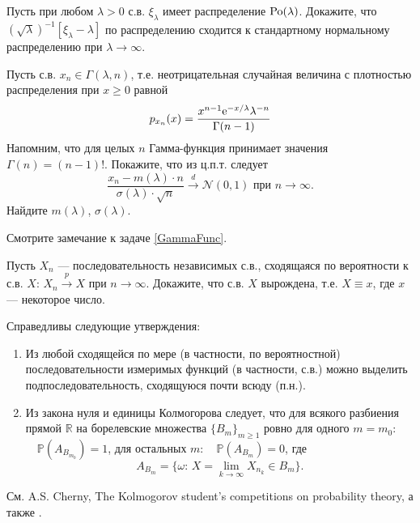 \begin{problem}
Пусть при любом $\lambda >0$ с.в. $\xi _{\lambda } $ имеет распределение $\mathrm{Po}(\lambda)$. Докажите, что $(\sqrt{\lambda})^{-1}[\xi _{\lambda } -\lambda]  $ по распределению сходится  к стандартному нормальному распределению при $\lambda \to \infty $.
\end{problem}

\begin{problem} 
Пусть с.в. $x_n\in \Gamma(\lambda,n)$, т.е. неотрицательная случайная величина  с плотностью распределения при $x\geq 0$ равной 
$$
p_{x_n}(x) = \dfrac{x^{n-1}{\rm e}^{-x/\lambda}\lambda^{-n}}{\Gamma(n-1)}
$$
Напомним, что для целых $n$ Гамма-функция принимает значения $\Gamma(n) = (n-1)!$.
Покажите, что из ц.п.т. следует 
$$
\frac{x_n-m(\lambda)\cdot n}{\sigma(\lambda)\cdot\sqrt{n}} \xrightarrow{d} \mathcal{N}(0,1) \text{ при } n\to\infty . 
$$
Найдите $m(\lambda)$, $\sigma(\lambda)$. 
\end{problem}
\begin{remark}
Смотрите замечание к задаче \ref{GammaFunc}.
\end{remark}

\begin{problem}
Пусть $X_n$ --- последовательность независимых с.в., сходящаяся по вероятности к с.в. $X$:  $X_n\xrightarrow{p}X$ при $n\to\infty$. Докажите, 
что с.в. $X$ вырождена, т.е. $X\equiv x$, где $x$ --- некоторое число. 
\end{problem}

\begin{remark}

Справедливы следующие утверждения:

\begin{enumerate}
\item
Из любой сходящейся по мере (в частности, по вероятностной) последовательности 
измеримых функций (в частности, с.в.) можно выделить подпоследовательность, сходящуюся почти всюду (п.н.). 

\item
Из закона нуля и единицы Колмогорова следует, что для всякого разбиения прямой ${\mathbb R}$ на борелевские множества $\{ B_m\}_{m\geqslant 1}$ 
ровно для одного $m=m_0:$ $\quad {\mathbb P}(A_{B_{m_0}})=1$, для остальных $m:\quad {\mathbb P}(A_{B_m})=0$, где 
$$
A_{B_m}=\{ \omega: \, X=\lim\limits_{k\to\infty} X_{n_k}\in B_m \} . 
$$
\end{enumerate}

См. A.S. Cherny, The Kolmogorov student's competitions  on probability theory, а также \cite{22,220}.
\end{remark}

